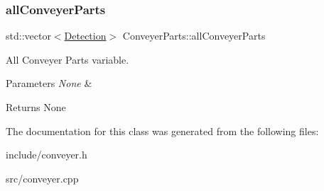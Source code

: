 \subsubsection{\texorpdfstring{all\+Conveyer\+Parts}{allConveyerParts}}
{\footnotesize\ttfamily std\+::vector$<$\hyperlink{classDetection}{Detection}$>$ Conveyer\+Parts\+::all\+Conveyer\+Parts}



All Conveyer Parts variable. 


\begin{DoxyParams}{Parameters}
{\em None} & \\
\hline
\end{DoxyParams}
\begin{DoxyReturn}{Returns}
None 
\end{DoxyReturn}


The documentation for this class was generated from the following files\+:\begin{DoxyCompactItemize}
\item 
include/conveyer.\+h\item 
src/conveyer.\+cpp\end{DoxyCompactItemize}
